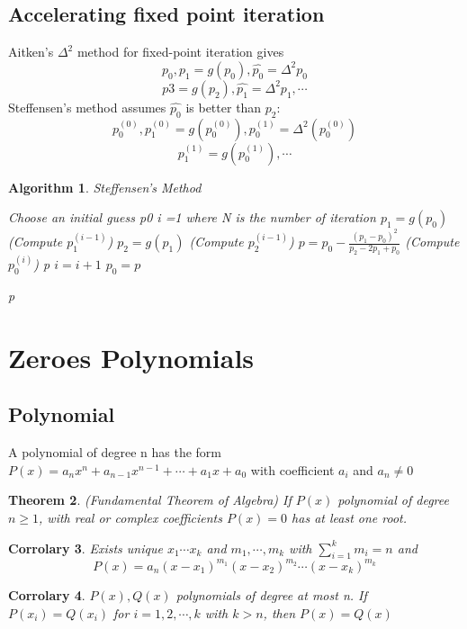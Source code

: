 \documentclass[12pt]{article}
\newtheorem{theorem}{Theorem}[subsection]
\newtheorem{cor}[theorem]{Corrolary}
\newtheorem{alg}[theorem]{Algorithm}
\begin{document}
\subsection{Accelerating fixed point iteration}
Aitken's $\Delta^2$ method for fixed-point iteration gives $$p_0, p_1 = g(p_0), \hat{p_0} = \Delta^2p_0$$ $$p3 = g(p_2), \hat{p_1} = \Delta^2p_1, \cdots$$
Steffensen's method assumes $\hat{p_0}$ is better than $p_2$: 
$$p_0^{(0)}, p_1^{(0)} = g(p_0^{(0)}), p_0^{(1)} = \Delta^2(p_0^{(0)})$$ $$p_1^{(1)} = g(p_0^{(1)}), \cdots$$
\begin{alg}{Steffensen's Method}
	\begin{algorithmic}
	Choose an initial guess p0
	\State i =1
	 where N is the number of iteration
		\State $p_1 = g(p_0)$ (Compute $p_1^{(i-1)}$)
		\State $p_2 = g(p_1)$ (Compute $p_2^{(i-1)}$)
		\State $p = p_0 - \frac{(p_1 - p_0)^2}{p_2 - 2p_1 + p_0}$ (Compute $p_0^{(i)}$)
			\State \Return p
		\EndIf
		\State $i = i+1$
		\State $p_0 = p$
		
	\EndWhile
	\State \Return p	
	\end{algorithmic}

\end{alg}


\section{Zeroes Polynomials}

\subsection{Polynomial}
A polynomial of degree n has the form $P(x) = a_nx^n +a_{n-1}x^{n-1} + \cdots +a_1x + a_0$ with coefficient $a_i$ and $a_n \neq 0$
\begin{theorem}{(Fundamental Theorem of Algebra)}
\newline If $P(x)$ polynomial of degree $n \geq 1$, with real or complex coefficients $P(x) = 0$ has at least one root. 	
\end{theorem} 

\begin{cor}
	Exists unique $x_1 \cdots x_k$ and $m_1,\cdots, m_k$ with $\sum_{i=1}^k m_i = n$ and $$P(x) = a_n(x-x_1)^{m_1}(x-x_2)^{m_2}\cdots (x-x_k)^{m_k}$$
\end{cor}

\begin{cor}
$P(x), Q(x)$ polynomials of  degree at most n. If $P(x_i) = Q(x_i)$ for $i = 1,2,\cdots, k$ with $k>n$, then $P(x) = Q(x)$	
\end{cor}
\end{document}
